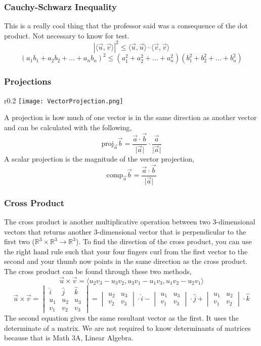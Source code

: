 \documentclass{article}
\begin{document}
\subsubsection{Cauchy-Schwarz Inequality}
This is a really cool thing that the professor said was a consequence of the dot product. Not necessary to know for test. 
$$|\langle\vec{u},\vec{v}\rangle|^2\leq\langle\vec{u},\vec{u}\rangle\cdot\langle\vec{v},\vec{v}\rangle$$
$$(a_1b_1+a_2b_2+...+a_nb_n)^2\leq(a_1^2+a_2^2+...+a_n^2)(b_1^2+b_2^2+...+b_n^2)$$


\subsubsection{Projections}
\begin{wrapfigure}{r}{0.2\textwidth}
    \texttt{[image: VectorProjection.png]}
    \label{fig:enter-label-3}
\end{wrapfigure}
A projection is how much of one vector is in the same direction as another vector and can be calculated with the following, 
$$\text{proj}_{\vec{a}}{\vec{b}} = \frac{\vec{a}\cdot\vec{b}}{\lvert\vec{a}\rvert} \cdot \frac{\vec{a}}{\lvert\vec{a}\rvert}$$
A scalar projection is the magnitude of the vector projection,
$$\text{comp}_{\vec{a}}{\vec{b}} = \frac{\vec{a}\cdot\vec{b}}{\lvert\vec{a}\rvert}$$

\subsubsection{Cross Product}
The cross product is another multiplicative operation between two 3-dimensional vectors that returns another 3-dimensional vector that is perpendicular to the first two ($\mathbb{R}^3 \times\mathbb{R}^3 \longrightarrow\mathbb{R}^3$). To find the direction of the cross product, you can use the right hand rule such that your four fingers curl from the first vector to the second and your thumb now points in the same direction as the cross product. The cross product can be found through these two methods,
$$\vec{u} \times \vec{v} = \langle u_2v_3-u_3v_2, u_3v_1-u_1v_3, u_1v_2-u_2v_1 \rangle$$
$$\vec{u} \times \vec{v} =
\begin{vmatrix}
\hat{i} & \hat{j} & \hat{k} \\ 
u_1 & u_2 & u_3 \\ 
v_1 & v_2 & v_3
\end{vmatrix}
=
\begin{vmatrix}
    u_2 & u_3 \\
    v_2 & v_3
\end{vmatrix}
\cdot \hat{i} - 
\begin{vmatrix}
    u_1 & u_3 \\
    v_1 & v_3
\end{vmatrix}
\cdot \hat{j} +
\begin{vmatrix}
    u_1 & u_2 \\
    v_1 & v_2
\end{vmatrix}
\cdot \hat{k}$$
The second equation gives the same resultant vector as the first. It uses the determinate of a matrix. We are not required to know determinants of matrices because that is Math 3A, Linear Algebra. 
\end{document}
